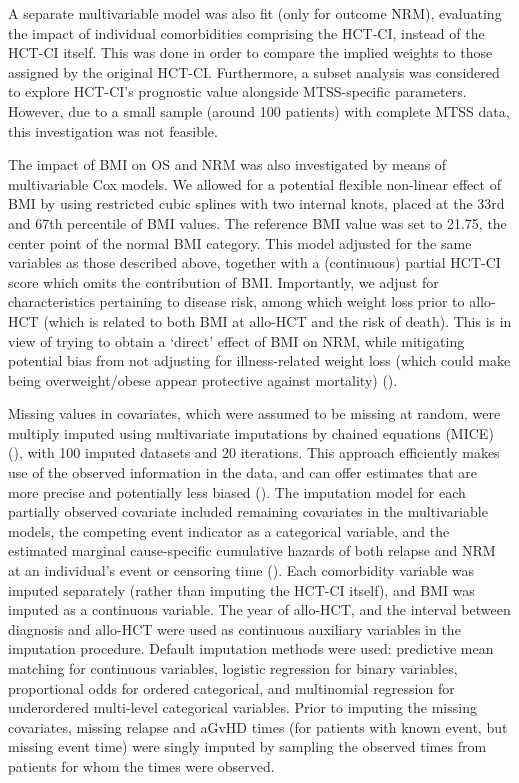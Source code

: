 \documentclass[
  letterpaper,
  paper=240mm:170mm,
  twoside=true,
  open=right,
  fontsize=10pt,
  pagesize=false,
  BCOR=15mm,
  DIV=14,
  headinclude=true,
  footinclude=false,
  headsepline=on]{scrbook}
\begin{document}
A separate multivariable model was also fit (only for outcome NRM),
evaluating the impact of individual comorbidities comprising the HCT-CI,
instead of the HCT-CI itself. This was done in order to compare the
implied weights to those assigned by the original HCT-CI. Furthermore, a
subset analysis was considered to explore HCT-CI's prognostic value
alongside MTSS-specific parameters. However, due to a small sample
(around 100 patients) with complete MTSS data, this investigation was
not feasible.

The impact of BMI on OS and NRM was also investigated by means of
multivariable Cox models. We allowed for a potential flexible non-linear
effect of BMI by using restricted cubic splines with two internal knots,
placed at the 33rd and 67th percentile of BMI values. The reference BMI
value was set to 21.75, the center point of the normal BMI category.
This model adjusted for the same variables as those described above,
together with a (continuous) partial HCT-CI score which omits the
contribution of BMI. Importantly, we adjust for characteristics
pertaining to disease risk, among which weight loss prior to allo-HCT
(which is related to both BMI at allo-HCT and the risk of death). This
is in view of trying to obtain a `direct' effect of BMI on NRM, while
mitigating potential bias from not adjusting for illness-related weight
loss (which could make being overweight/obese appear protective against
mortality) ().

Missing values in covariates, which were assumed to be missing at
random, were multiply imputed using multivariate imputations by chained
equations (MICE)
(), with 100 imputed datasets and 20 iterations. This
approach efficiently makes use of the observed information in the data,
and can offer estimates that are more precise and potentially less
biased (). The imputation model for each partially observed
covariate included remaining covariates in the multivariable models, the
competing event indicator as a categorical variable, and the estimated
marginal cause-specific cumulative hazards of both relapse and NRM at an
individual's event or censoring time
(). Each comorbidity variable was imputed separately
(rather than imputing the HCT-CI itself), and BMI was imputed as a
continuous variable. The year of allo-HCT, and the interval between
diagnosis and allo-HCT were used as continuous auxiliary variables in
the imputation procedure. Default imputation methods were used:
predictive mean matching for continuous variables, logistic regression
for binary variables, proportional odds for ordered categorical, and
multinomial regression for underordered multi-level categorical
variables. Prior to imputing the missing covariates, missing relapse and
aGvHD times (for patients with known event, but missing event time) were
singly imputed by sampling the observed times from patients for whom the
times were observed.
\end{document}
